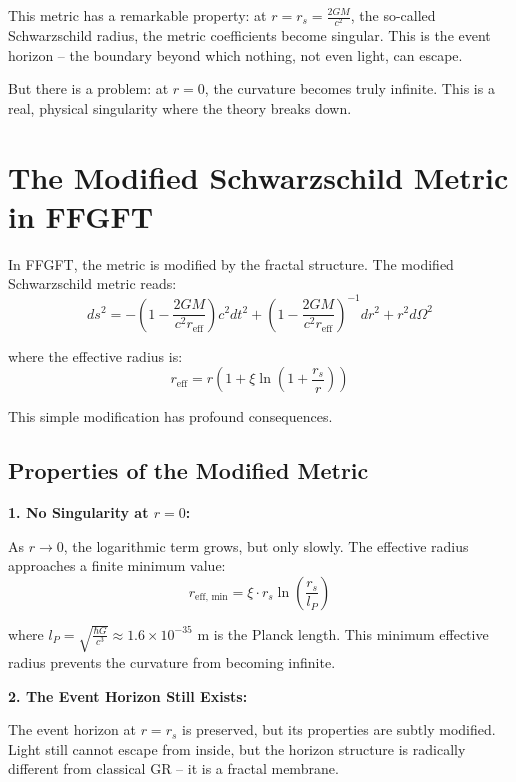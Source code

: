 This metric has a remarkable property: at $r = r_s = \frac{2GM}{c^2}$, the so-called Schwarzschild radius, the metric coefficients become singular. This is the event horizon -- the boundary beyond which nothing, not even light, can escape.

But there is a problem: at $r = 0$, the curvature becomes truly infinite. This is a real, physical singularity where the theory breaks down.

\section{The Modified Schwarzschild Metric in FFGFT}

In FFGFT, the metric is modified by the fractal structure. The modified Schwarzschild metric reads:
\begin{equation}
ds^2 = -\left(1 - \frac{2GM}{c^2 r_{\text{eff}}}\right) c^2 dt^2 + \left(1 - \frac{2GM}{c^2 r_{\text{eff}}}\right)^{-1} dr^2 + r^2 d\Omega^2
\end{equation}

where the effective radius is:
\begin{equation}
r_{\text{eff}} = r \left(1 + \xi \ln\left(1 + \frac{r_s}{r}\right)\right)
\end{equation}

This simple modification has profound consequences.

\subsection{Properties of the Modified Metric}

\textbf{1. No Singularity at $r = 0$:}

As $r \to 0$, the logarithmic term grows, but only slowly. The effective radius approaches a finite minimum value:
\begin{equation}
r_{\text{eff, min}} = \xi \cdot r_s \ln\left(\frac{r_s}{l_P}\right)
\end{equation}

where $l_P = \sqrt{\frac{\hbar G}{c^3}} \approx 1.6 \times 10^{-35}$ m is the Planck length. This minimum effective radius prevents the curvature from becoming infinite.

\textbf{2. The Event Horizon Still Exists:}

The event horizon at $r = r_s$ is preserved, but its properties are subtly modified. Light still cannot escape from inside, but the horizon structure is radically different from classical GR -- it is a fractal membrane.

